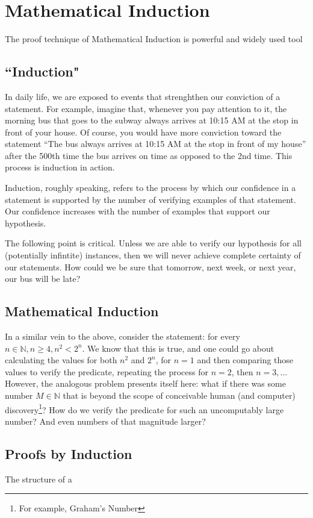 \documentclass[../proofs.tex]{subfiles}
\begin{document}
\chapter{Mathematical Induction}
The proof technique of Mathematical Induction is powerful and widely used tool

\section{``Induction"}
In daily life, we are exposed to events that strenghthen our conviction of a
statement. For example, imagine that, whenever you pay attention to it, the
morning bus that goes to the subway always arrives at 10:15 AM at the stop
in front of your house. 
Of course, you would have more conviction toward the statement ``The bus always
arrives at 10:15 AM at the stop in front of my house'' after the 500th time the
bus arrives on time as opposed to the 2nd time. This process is induction in
action.

Induction, roughly speaking, refers to the process by which our confidence
in a statement is supported by the number of verifying examples of that
statement. Our confidence increases with the number of examples that support 
our hypothesis.

The following point is critical. Unless we are able to verify our hypothesis
for all (potentially infintite) instances, then we will never achieve complete
certainty of our statements. How could we be sure that tomorrow, next week,
or next year, our bus will be late?

\section{Mathematical Induction}
In a similar vein to the above, consider the statement: for every
$n \in \mathbb{N}, n \geq 4, n^2 < 2^n$. %
We know that this is true, and one could go about calculating
the values for both $n^2$ and $2^n$, for $n = 1$ and then comparing those
values to verify the predicate, repeating the process for $n=2$, then
$n=3, \ldots$ However, the analogous problem presents itself here: what if
there was some number $M \in \mathbb{N}$ that is beyond the scope of
conceivable human (and computer) discovery\footnote{For example,
Graham's Number}? How do we verify the predicate for such an uncomputably
large number? And even numbers of that magnitude larger?

\section{Proofs by Induction}
  The structure of a
\end{document}
